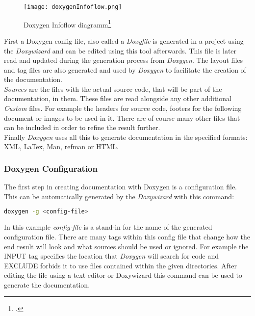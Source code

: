 \begin{figure}[h]
	\centering
	\texttt{[image: doxygenInfoflow.png]} 
	\caption{Doxygen Infoflow diagramm\footcite{doxygen_main_site}}
	\label{fig:doxygenInfoflow}
\end{figure}

First a Doxygen config file, also called a \textit{Doxyfile} is generated in a project using the \textit{Doxywizard} and can be edited using this tool afterwards. 
This file is later read and updated during the generation process from \textit{Doxygen}. The layout files and tag files are also generated and used by \textit{Doxygen}
to facilitate the creation of the documentation.\\

\textit{Sources} are the files with the actual source code, that will be part of the documentation, in them. These files are read alongside any other additional \textit{Custom}
files. For example the headers for source code, footers for the following document or images to be used in it. There are of course many other files that can be included
in order to refine the result further.\\

Finally \textit{Doxygen} uses all this to generate documentation in the specified formats: XML, LaTex, Man, refman or HTML. \\

\subsubsection{Doxygen Configuration}
The first step in creating documentation with Doxygen is a configuration file. This can be automatically generated by the \textit{Doxywizard} with this command:

\begin{lstlisting}[language=bash]
    doxygen -g <config-file>
\end{lstlisting}

In this example \textit{config-file} is a stand-in for the name of the generated configuration file. There are many tags within this config file that change how 
the end result will look and what sources should be used or ignored. For example the INPUT tag specifies the location that \textit{Doxygen} will search for code and
EXCLUDE forbids it to use files contained within the given directories. After editing the file using a text editor or Doxywizard this command can be used to generate 
the documentation.

